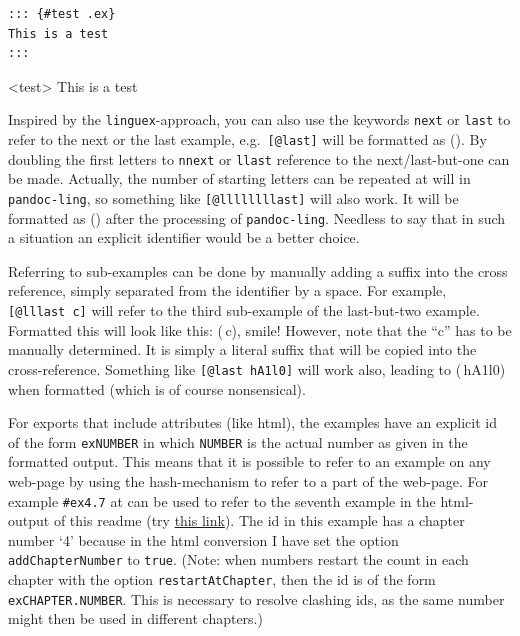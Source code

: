 \documentclass[
]{article}
\begin{document}
\begin{verbatim}
::: {#test .ex}
This is a test
:::
\end{verbatim}

\begin{samepage}
\ex<test> 
  This is a test
\xe
\end{samepage}

Inspired by the \texttt{linguex}-approach, you can also use the keywords
\texttt{next} or \texttt{last} to refer to the next or the last example,
e.g.~\texttt{{[}@last{]}} will be formatted as (). By
doubling the first letters to \texttt{nnext} or \texttt{llast} reference
to the next/last-but-one can be made. Actually, the number of starting
letters can be repeated at will in \texttt{pandoc-ling}, so something
like \texttt{{[}@llllllllast{]}} will also work. It will be formatted as
() after the processing of \texttt{pandoc-ling}. Needless to
say that in such a situation an explicit identifier would be a better
choice.

Referring to sub-examples can be done by manually adding a suffix into
the cross reference, simply separated from the identifier by a space.
For example, \texttt{{[}@lllast~c{]}} will refer to the third
sub-example of the last-but-two example. Formatted this will look like
this: (\,c), smile! However, note that the ``c'' has to be
manually determined. It is simply a literal suffix that will be copied
into the cross-reference. Something like \texttt{{[}@last\ hA1l0{]}}
will work also, leading to (\,hA1l0) when formatted (which
is of course nonsensical).

For exports that include attributes (like html), the examples have an
explicit id of the form \texttt{exNUMBER} in which \texttt{NUMBER} is
the actual number as given in the formatted output. This means that it
is possible to refer to an example on any web-page by using the
hash-mechanism to refer to a part of the web-page. For example
\texttt{\#ex4.7} at can be used to refer to the seventh example in the
html-output of this readme (try
\href{https://cysouw.github.io/pandoc-ling/readme.html\#ex4.7}{this
link}). The id in this example has a chapter number `4' because in the
html conversion I have set the option \texttt{addChapterNumber} to
\texttt{true}. (Note: when numbers restart the count in each chapter
with the option \texttt{restartAtChapter}, then the id is of the form
\texttt{exCHAPTER.NUMBER}. This is necessary to resolve clashing ids, as
the same number might then be used in different chapters.)
\end{document}
